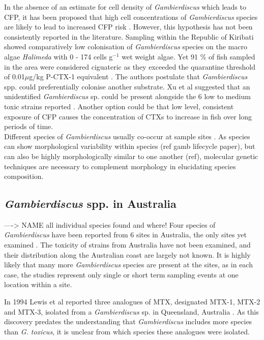\documentclass[12pt]{article}
\begin{document}
In the absence of an estimate for cell density of \emph{Gambierdiscus} which leads to CFP, it has been proposed  that high cell concentrations of \emph{Gambierdiscus} species are likely to lead to increased CFP risk \cite{litaker2010global}. 
However, this hypothesis has not been consistently reported in the literature. Sampling within the Republic of Kiribati showed comparatively low colonisation of \emph{Gambierdiscus} species on the macro algae \emph{Halimeda} with 0 - 174 cells g$^{-1}$ wet weight algae. Yet 91 \% of fish sampled in the area were considered ciguateric as they exceeded the quarantine threshold of 0.01$\mu$g/kg P-CTX-1 equivalent \cite{xu2014distribution,chan2011spatial}. The authors postulate that \emph{Gambierdiscus} spp. could preferentially colonise another substrate. Xu et al suggested that an unidentified \emph{Gambierdiscus} sp. could be present alongside the 6 low to medium toxic strains reported \cite{xu2014distribution,bomber1988r}. Another option could be that low level, consistent exposure of CFP causes the concentration of CTXs to increase in fish over long periods of time.\\

Different species of \emph{Gambierdiscus} usually co-occur at sample sites \cite{litaker2010global}. As species can show morphological variability within species (ref gamb lifecycle paper), but can also be highly morphologically similar to one another (ref), molecular genetic techniques are necessary to complement morphology in elucidating species composition.

\subsection{\emph{Gambierdiscus} spp. in Australia}
---->  NAME all individual species found and where!
Four species of \emph{Gambierdiscus} have been reported from 6 sites in Australia, the only sites yet examined \cite{kohli2014cob,murray2014molecular}. The toxicity of strains from Australia have not been examined, and their distribution along the Australian coast are largely not known. It is highly likely that many more \emph{Gambierdiscus} species are present at the sites, as in each case, the studies represent only single or short term sampling events at one location within a site.


In 1994 Lewis et al reported three analogues of MTX, designated MTX-1, MTX-2 and MTX-3, isolated from a \emph{Gambierdiscus} sp. in Queensland, Australia \cite{holmes1994purification}. As this discovery predates the understanding that \emph{Gambierdiscus} includes more species than \emph{G. toxicus}, it is unclear from which species these analogues were isolated.  \\
\end{document}

